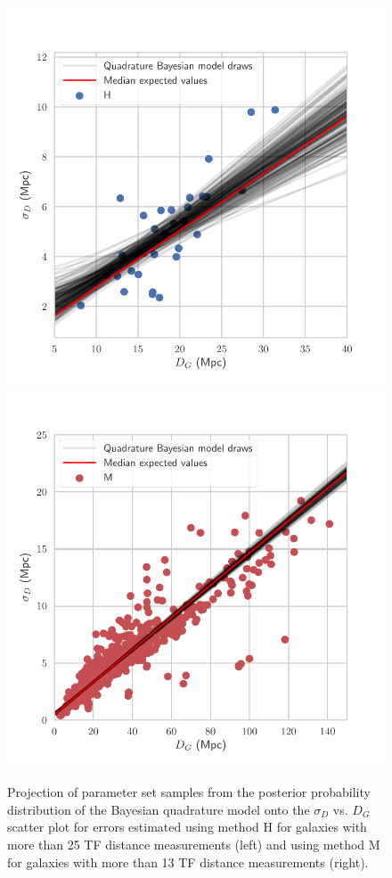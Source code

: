 \documentclass[a4paper,fleqn,usenatbib]{mnras}
\begin{document}
\begin{figure}
	\includegraphics[scale=0.69]{f12drawsq}
	\includegraphics[scale=0.69]{f13drawsq2}
    \caption{Projection of parameter set samples from the posterior probability distribution of the Bayesian quadrature model onto the  $\sigma_D$ vs. $D_G$ scatter plot for errors estimated using method H for galaxies with more than 25 TF distance measurements (left) and using method M for galaxies with more than 13 TF distance measurements (right).}
    \label{fig:drawsq}
\end{figure}
\end{document}
